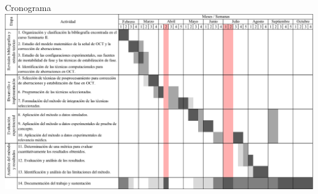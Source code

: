 \documentclass[fleqn,10pt,aspectratio=169,dvipsnames]{beamer}
\begin{document}
\begin{frame}[t]{Cronograma}
\vspace{-.5\baselineskip}
\includegraphics[width=.95\textwidth]{../Figuras/Cronograma.pdf}
\end{frame}


{\aauwavesbg%
	\begin{frame}
	\end{frame}}
\end{document}
